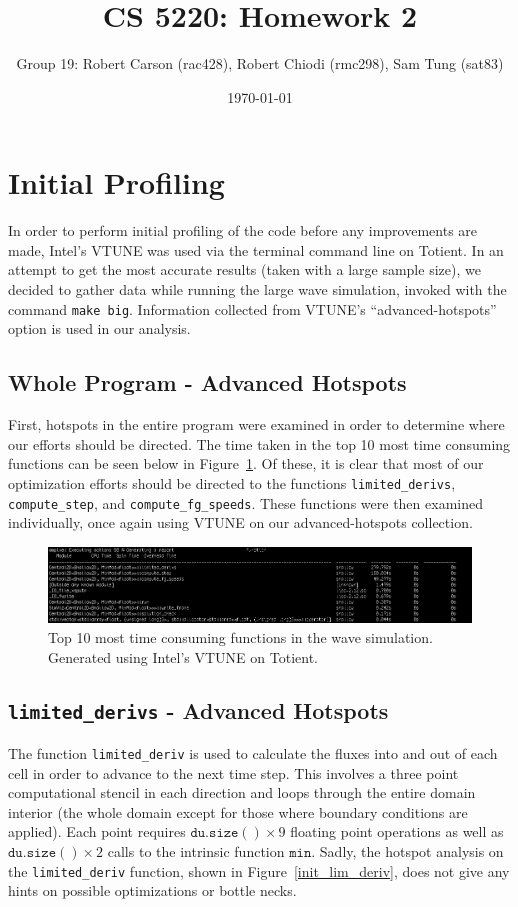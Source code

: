 \documentclass[12pt]{article}
\begin{document}
	
	\title{CS 5220: Homework 2}
	\date{\today}
	\author{Group 19: Robert Carson (rac428), Robert Chiodi (rmc298), Sam Tung (sat83)}
	\maketitle
		
	\section{Initial Profiling}
	In order to perform initial profiling of the code before any improvements are made, Intel's VTUNE was used via the terminal command line on Totient. In an attempt to get the most accurate results (taken with a large sample size), we decided to gather data while running the large wave simulation, invoked with the command \texttt{make big}. Information collected from VTUNE's ``advanced-hotspots'' option is used in our analysis.
		\subsection{Whole Program - Advanced Hotspots}
		First, hotspots in the entire program were examined in order to determine where our efforts should be directed. The time taken in the top 10 most time consuming functions can be seen below in Figure~\ref{top10}. Of these, it is clear that most of our optimization efforts should be directed to the functions \texttt{limited\_derivs}, \texttt{compute\_step}, and \texttt{compute\_fg\_speeds}. These functions were then examined individually, once again using VTUNE on our advanced-hotspots collection.
		\begin{figure}[h!]
			\begin{center}
				\includegraphics[width=0.7\columnwidth]{top10}
				\caption{Top 10 most time consuming functions in the wave simulation. Generated using Intel's VTUNE on Totient.}
				\label{top10}
			\end{center}
		\end{figure}
		\subsection{\texttt{limited\_derivs} - Advanced Hotspots}
		The function \texttt{limited\_deriv} is used to calculate the fluxes into and out of each cell in order to advance to the next time step. This involves a three point computational stencil in each direction and loops through the entire domain interior (the whole domain except for those where boundary conditions are applied). Each point requires $\mathtt{du.size()}\times 9$ floating point operations as well as $\mathtt{du.size()} \times 2$ calls to the intrinsic function $\mathtt{min}$. Sadly, the hotspot analysis on the \texttt{limited\_deriv} function, shown in Figure~\ref{init_lim_deriv}, does not give any hints on possible optimizations or bottle necks.
		
\end{document}
